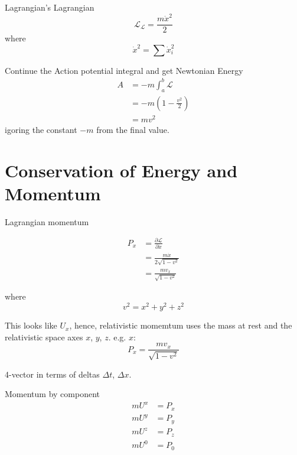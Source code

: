 \documentclass{article}
\begin{document}
Lagrangian's Lagrangian
\begin{equation}
\mathscr{L}_{\mathscr{L}} = \frac{m \dot x^2}{2}
\end{equation}
where
\begin{equation}
\dot x^2 = \sum{ \dot x_i^{2}}
\end{equation}

Continue the Action potential integral and get Newtonian Energy
\begin{equation}
\begin{split}
A  &= -m\int_a^b{\mathscr{L}}\\
&= -m\left( 1 - \frac{v^2}{2} \right)\\
&= mv^2
\end{split}
\end{equation}
igoring the constant $-m$ from the final value.

\section{Conservation of Energy and Momentum}

Lagrangian momentum

\begin{equation}
\begin{split}
P_x &= \frac{\partial\mathscr{L}}{\partial  \dot x}\\
&= \frac{m \dot x}{2 \sqrt{1 - v^2}}\\
&= \frac{m v_x}{\sqrt{1-v^{2}}}
\end{split}
\end{equation}

where
\begin{equation}
v^2 = x^2 + y^2 + z^2
\end{equation}

This looks like $U_x$, hence, relativistic momemtum uses the mass at rest and the relativistic space axes $x$, $y$, $z$. e.g. $x$:
\begin{equation}
P_x = \frac{m v_x}{\sqrt{1-v^2}}
\end{equation}

4-vector in terms of deltas $\Delta t$, $\Delta x$.

Momentum by component
\begin{equation}
\begin{split}
mU^x &= P_x\\
mU^y &= P_y\\
mU^z &= P_z\\
mU^0 &= P_0
\end{split}
\end{equation}
\end{document}
